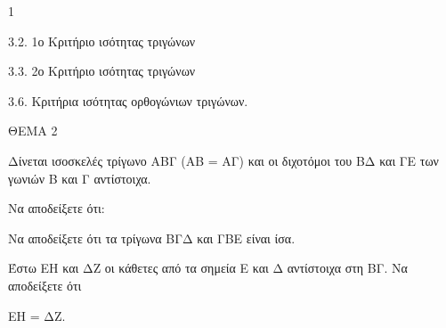\begin{ylh}{1}
    \item 3.2. 1ο Κριτήριο ισότητας τριγώνων
    \item 3.3. 2ο Κριτήριο ισότητας τριγώνων
    \item 3.6. Κριτήρια ισότητας ορθογώνιων τριγώνων.
\end{ylh}

ΘΕΜΑ 2

Δίνεται ισοσκελές τρίγωνο ΑΒΓ (ΑΒ = ΑΓ) και οι διχοτόμοι του ΒΔ και ΓΕ των γωνιών Β και Γ αντίστοιχα.

Να αποδείξετε ότι:

\begin{alist}
\item Να αποδείξετε ότι τα τρίγωνα ΒΓΔ και ΓΒΕ είναι ίσα. 

\item Έστω ΕΗ και ΔΖ οι κάθετες από τα σημεία Ε και Δ αντίστοιχα στη ΒΓ. Να αποδείξετε ότι

ΕΗ = ΔΖ. 
\end{alist}

